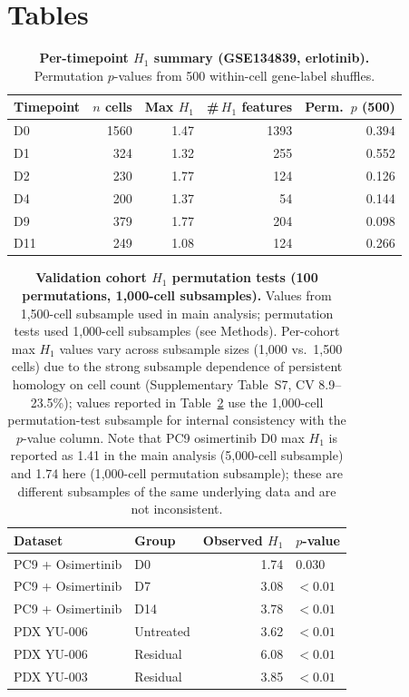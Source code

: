 \clearpage
\section*{Tables}

\begin{table}[htbp]
  \centering
  \caption{\textbf{Per-timepoint $H_1$ summary (GSE134839, erlotinib).}
  Permutation $p$-values from 500 within-cell gene-label shuffles.}
  \label{tab:per_timepoint}
  \begin{tabularx}{0.85\linewidth}{l r r r r}
    \toprule
    Timepoint & $n$ cells & Max $H_1$ & \#\,$H_1$ features & Perm.\ $p$ (500) \\
    \midrule
    D0  & 1560 & 1.47 & 1393 & 0.394 \\
    D1  &  324 & 1.32 &  255 & 0.552 \\
    D2  &  230 & 1.77 &  124 & 0.126 \\
    D4  &  200 & 1.37 &   54 & 0.144 \\
    D9  &  379 & 1.77 &  204 & 0.098 \\
    D11 &  249 & 1.08 &  124 & 0.266 \\
    \bottomrule
  \end{tabularx}
\end{table}

\begin{table}[htbp]
  \centering
  \caption{\textbf{Validation cohort $H_1$ permutation tests
  (100 permutations, 1{,}000-cell subsamples).} Values from 1{,}500-cell
  subsample used in main analysis; permutation tests used 1{,}000-cell
  subsamples (see Methods). Per-cohort max $H_1$ values vary across
  subsample sizes (1{,}000 vs.\ 1{,}500 cells) due to the strong
  subsample dependence of persistent homology on cell count
  (Supplementary Table~S7, CV 8.9--23.5\%); values reported in
  Table~\ref{tab:validation} use the 1{,}000-cell permutation-test
  subsample for internal consistency with the $p$-value column. Note
  that PC9 osimertinib D0 max $H_1$ is reported as 1.41 in the main
  analysis (5{,}000-cell subsample) and 1.74 here (1{,}000-cell
  permutation subsample); these are different subsamples of the same
  underlying data and are not inconsistent.}
  \label{tab:validation}
  \begin{tabularx}{0.85\linewidth}{l l r l}
    \toprule
    Dataset & Group & Observed $H_1$ & $p$-value \\
    \midrule
    PC9 + Osimertinib & D0        & 1.74 & 0.030 \\
    PC9 + Osimertinib & D7        & 3.08 & $< 0.01$ \\
    PC9 + Osimertinib & D14       & 3.78 & $< 0.01$ \\
    PDX YU-006        & Untreated & 3.62 & $< 0.01$ \\
    PDX YU-006        & Residual  & 6.08 & $< 0.01$ \\
    PDX YU-003        & Residual  & 3.85 & $< 0.01$ \\
    \bottomrule
  \end{tabularx}
\end{table}

